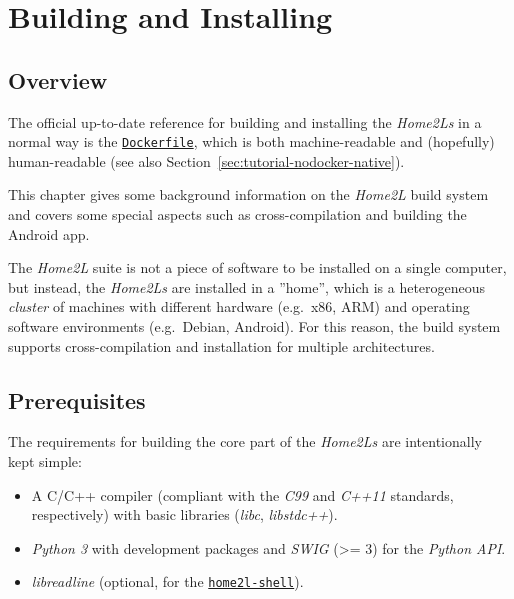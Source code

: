 \documentclass[12pt,english,parskip=half,headheight=19pt]{scrreprt}
\newcommand{\idx}[1]{#1\index{#1}}
\newcommand{\reftool}[1]{\hyperref[tool:#1]{\texttt{\idx{#1}}}}
\newcommand{\refsrc}[1]{\href{#1}{\texttt{#1}}}     %
\begin{document}
%
\chapter{Building and Installing}
\label{ch:installing}
%




\section{Overview}
\label{sec:installing-intro}


The official up-to-date reference for building and installing the \textit{Home2Ls} in a normal way is the \refsrc{Dockerfile}, which is both machine-readable and (hopefully) human-readable (see also Section~\ref{sec:tutorial-nodocker-native}).

This chapter gives some background information on the \textit{Home2L} build system and covers some special aspects such as cross-compilation and building the Android app.

The \textit{Home2L} suite is not a piece of software to be installed on a single computer, but instead, the \textit{Home2Ls} are installed in a ''home'', which is a heterogeneous \textit{cluster} of machines with different hardware (e.g.~x86, ARM) and operating software environments (e.g.~Debian, Android).
For this reason, the build system supports cross-compilation and installation for multiple architectures.





\section{Prerequisites}
\label{sec:installing-prerequisites}


The requirements for building the core part of the \textit{Home2Ls} are intentionally kept simple:

\begin{itemize}
\item
  A C/C++ compiler (compliant with the \textit{C99} and \textit{C++11} standards, respectively)
  with basic libraries (\textit{libc}, \textit{libstdc++}).
\item
  \textit{Python 3} with development packages and \textit{SWIG}
  (\textgreater{}= 3) for the \textit{Python API}.
\item
  \textit{libreadline} (optional, for the \reftool{home2l-shell}).
\end{itemize}
\end{document}
